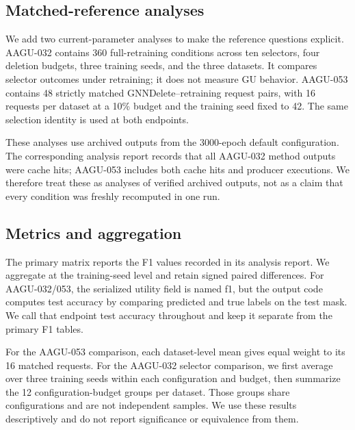 \subsection{Matched-reference analyses}
We add two current-parameter analyses to make the reference questions explicit. AAGU-032 contains 360 full-retraining conditions across ten selectors, four deletion budgets, three training seeds, and the three datasets. It compares selector outcomes under retraining; it does not measure GU behavior. AAGU-053 contains 48 strictly matched GNNDelete--retraining request pairs, with 16 requests per dataset at a 10\% budget and the training seed fixed to 42. The same selection identity is used at both endpoints.

These analyses use archived outputs from the 3000-epoch default configuration. The corresponding analysis report records that all AAGU-032 method outputs were cache hits; AAGU-053 includes both cache hits and producer executions. We therefore treat these as analyses of verified archived outputs, not as a claim that every condition was freshly recomputed in one run.

\subsection{Metrics and aggregation}
The primary matrix reports the F1 values recorded in its analysis report. We aggregate at the training-seed level and retain signed paired differences. For AAGU-032/053, the serialized utility field is named f1, but the output code computes test accuracy by comparing predicted and true labels on the test mask. We call that endpoint test accuracy throughout and keep it separate from the primary F1 tables.

For the AAGU-053 comparison, each dataset-level mean gives equal weight to its 16 matched requests. For the AAGU-032 selector comparison, we first average over three training seeds within each configuration and budget, then summarize the 12 configuration-budget groups per dataset. Those groups share configurations and are not independent samples. We use these results descriptively and do not report significance or equivalence from them.

